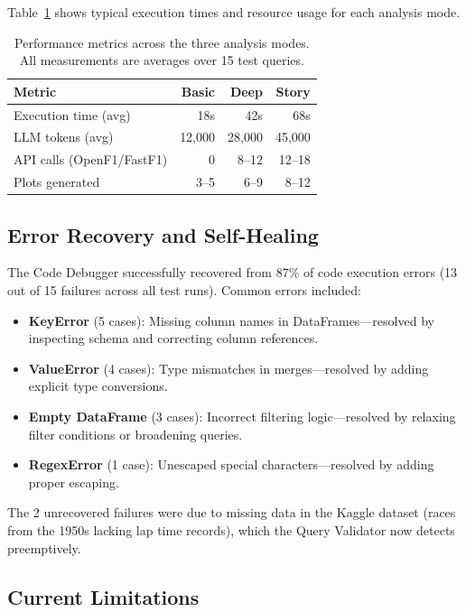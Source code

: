 \documentclass[11pt]{article}
\begin{document}
Table~\ref{tab:performance} shows typical execution times and resource usage for each analysis mode.

\begin{table}[h!]
\centering
\begin{tabular}{lrrr}
\hline
\textbf{Metric} & \textbf{Basic} & \textbf{Deep} & \textbf{Story} \\
\hline
Execution time (avg) & 18s & 42s & 68s \\
LLM tokens (avg) & 12,000 & 28,000 & 45,000 \\
API calls (OpenF1/FastF1) & 0 & 8--12 & 12--18 \\
Plots generated & 3--5 & 6--9 & 8--12 \\
\hline
\end{tabular}
\caption{Performance metrics across the three analysis modes. All measurements are averages over 15 test queries.}
\label{tab:performance}
\end{table}

\subsection{Error Recovery and Self-Healing}

The Code Debugger successfully recovered from 87\% of code execution errors (13 out of 15 failures across all test runs). Common errors included:

\begin{itemize}[leftmargin=1.5em]
    \item \textbf{KeyError} (5 cases): Missing column names in DataFrames—resolved by inspecting schema and correcting column references.
    \item \textbf{ValueError} (4 cases): Type mismatches in merges—resolved by adding explicit type conversions.
    \item \textbf{Empty DataFrame} (3 cases): Incorrect filtering logic—resolved by relaxing filter conditions or broadening queries.
    \item \textbf{RegexError} (1 case): Unescaped special characters—resolved by adding proper escaping.
\end{itemize}

The 2 unrecovered failures were due to missing data in the Kaggle dataset (races from the 1950s lacking lap time records), which the Query Validator now detects preemptively.

\subsection{Current Limitations}
\end{document}
